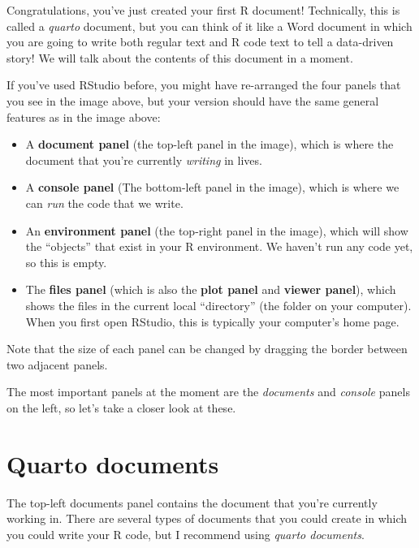 \documentclass[
  letterpaper,
  DIV=11,
  numbers=noendperiod]{scrreprt}
\begin{document}
Congratulations, you've just created your first R document! Technically,
this is called a \emph{quarto} document, but you can think of it like a
Word document in which you are going to write both regular text and R
code text to tell a data-driven story! We will talk about the contents
of this document in a moment.

If you've used RStudio before, you might have re-arranged the four
panels that you see in the image above, but your version should have the
same general features as in the image above:

\begin{itemize}
\item
  A \textbf{document panel} (the top-left panel in the image), which is
  where the document that you're currently \emph{writing} in lives.
\item
  A \textbf{console panel} (The bottom-left panel in the image), which
  is where we can \emph{run} the code that we write.
\item
  An \textbf{environment panel} (the top-right panel in the image),
  which will show the ``objects'' that exist in your R environment. We
  haven't run any code yet, so this is empty.
\item
  The \textbf{files panel} (which is also the \textbf{plot panel} and
  \textbf{viewer panel}), which shows the files in the current local
  ``directory'' (the folder on your computer). When you first open
  RStudio, this is typically your computer's home page.
\end{itemize}

Note that the size of each panel can be changed by dragging the border
between two adjacent panels.

The most important panels at the moment are the \emph{documents} and
\emph{console} panels on the left, so let's take a closer look at these.

\section{Quarto documents}\label{quarto-documents}

The top-left documents panel contains the document that you're currently
working in. There are several types of documents that you could create
in which you could write your R code, but I recommend using \emph{quarto
documents}.
\end{document}
